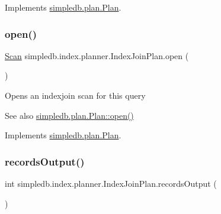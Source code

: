 Implements \hyperlink{interfacesimpledb_1_1plan_1_1Plan_a55094c16c756b0c09b5c71b94d573271}{simpledb.\+plan.\+Plan}.

\mbox{\label{classsimpledb_1_1index_1_1planner_1_1IndexJoinPlan_ab9c7fc729baa00380ee1a314578f5828}} 
\subsubsection{\texorpdfstring{open()}{open()}}
{\footnotesize\ttfamily \hyperlink{interfacesimpledb_1_1query_1_1Scan}{Scan} simpledb.\+index.\+planner.\+Index\+Join\+Plan.\+open (\begin{DoxyParamCaption}{ }\end{DoxyParamCaption})\hspace{0.3cm}{\ttfamily [inline]}}

Opens an indexjoin scan for this query \begin{DoxySeeAlso}{See also}
\hyperlink{interfacesimpledb_1_1plan_1_1Plan_aaa4c15cda4e9c0d52308850f9f13ff99}{simpledb.\+plan.\+Plan\+::open()} 
\end{DoxySeeAlso}


Implements \hyperlink{interfacesimpledb_1_1plan_1_1Plan_aaa4c15cda4e9c0d52308850f9f13ff99}{simpledb.\+plan.\+Plan}.

\mbox{\label{classsimpledb_1_1index_1_1planner_1_1IndexJoinPlan_a885b5d4ff1b8b96353d58a87417e6f5f}} 
\subsubsection{\texorpdfstring{records\+Output()}{recordsOutput()}}
{\footnotesize\ttfamily int simpledb.\+index.\+planner.\+Index\+Join\+Plan.\+records\+Output (\begin{DoxyParamCaption}{ }\end{DoxyParamCaption})\hspace{0.3cm}{\ttfamily [inline]}}

